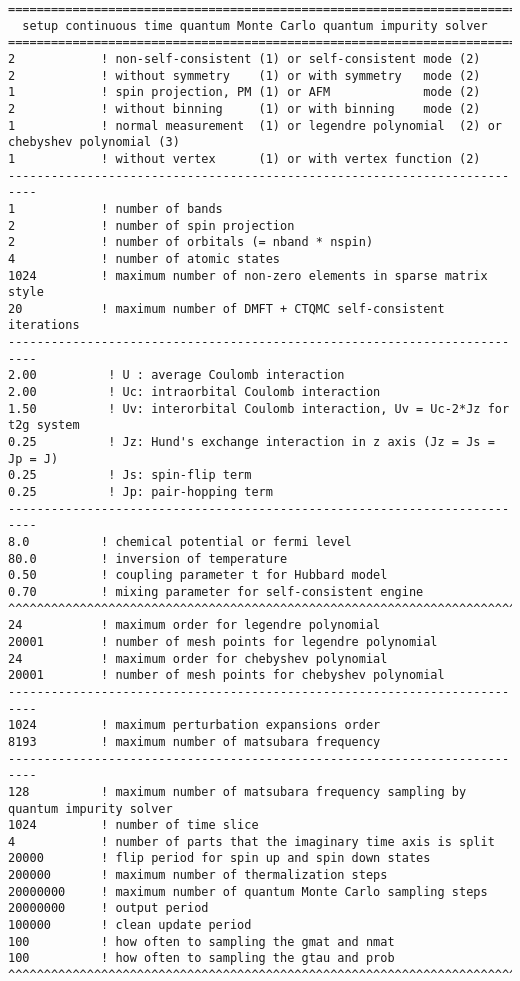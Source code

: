 \begin{lstlisting}[frame=single]
==========================================================================
  setup continuous time quantum Monte Carlo quantum impurity solver
==========================================================================
2            ! non-self-consistent (1) or self-consistent mode (2)
2            ! without symmetry    (1) or with symmetry   mode (2)
1            ! spin projection, PM (1) or AFM             mode (2)
2            ! without binning     (1) or with binning    mode (2)
1            ! normal measurement  (1) or legendre polynomial  (2) or chebyshev polynomial (3)
1            ! without vertex      (1) or with vertex function (2)
--------------------------------------------------------------------------
1            ! number of bands
2            ! number of spin projection
2            ! number of orbitals (= nband * nspin)
4            ! number of atomic states
1024         ! maximum number of non-zero elements in sparse matrix style
20           ! maximum number of DMFT + CTQMC self-consistent iterations
--------------------------------------------------------------------------
2.00          ! U : average Coulomb interaction
2.00          ! Uc: intraorbital Coulomb interaction
1.50          ! Uv: interorbital Coulomb interaction, Uv = Uc-2*Jz for t2g system
0.25          ! Jz: Hund's exchange interaction in z axis (Jz = Js = Jp = J)
0.25          ! Js: spin-flip term
0.25          ! Jp: pair-hopping term
--------------------------------------------------------------------------
8.0          ! chemical potential or fermi level
80.0         ! inversion of temperature
0.50         ! coupling parameter t for Hubbard model
0.70         ! mixing parameter for self-consistent engine
^^^^^^^^^^^^^^^^^^^^^^^^^^^^^^^^^^^^^^^^^^^^^^^^^^^^^^^^^^^^^^^^^^^^^^^^^^
24           ! maximum order for legendre polynomial
20001        ! number of mesh points for legendre polynomial
24           ! maximum order for chebyshev polynomial
20001        ! number of mesh points for chebyshev polynomial
--------------------------------------------------------------------------
1024         ! maximum perturbation expansions order
8193         ! maximum number of matsubara frequency
--------------------------------------------------------------------------
128          ! maximum number of matsubara frequency sampling by quantum impurity solver
1024         ! number of time slice
4            ! number of parts that the imaginary time axis is split
20000        ! flip period for spin up and spin down states
200000       ! maximum number of thermalization steps
20000000     ! maximum number of quantum Monte Carlo sampling steps
20000000     ! output period
100000       ! clean update period
100          ! how often to sampling the gmat and nmat
100          ! how often to sampling the gtau and prob
^^^^^^^^^^^^^^^^^^^^^^^^^^^^^^^^^^^^^^^^^^^^^^^^^^^^^^^^^^^^^^^^^^^^^^^^^^
\end{lstlisting}

